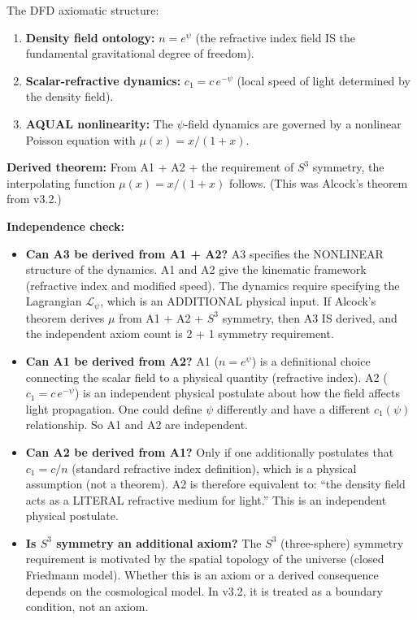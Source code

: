 \documentclass[11pt]{article}
\begin{document}
\begin{tcolorbox}[colback=blue!5!white, colframe=blue!70!black,
  title=\textbf{W4i23 TOP 5 FINDINGS --- PREDICTIONS TEAM}]
\begin{enumerate}
  The DFD axiomatic structure:
  \begin{enumerate}[label=\textbf{A\arabic*.}]
  \item \textbf{Density field ontology:}  $n = e^\psi$ (the refractive
    index field IS the fundamental gravitational degree of freedom).
  \item \textbf{Scalar-refractive dynamics:}  $c_1 = c\,e^{-\psi}$
    (local speed of light determined by the density field).
  \item \textbf{AQUAL nonlinearity:}  The $\psi$-field dynamics are
    governed by a nonlinear Poisson equation with $\mu(x) = x/(1+x)$.
  \end{enumerate}
  \textbf{Derived theorem:}  From A1 + A2 + the requirement of $S^3$
  symmetry, the interpolating function $\mu(x) = x/(1+x)$ follows.
  (This was Alcock's theorem from v3.2.)

  \textbf{Independence check:}

  \begin{itemize}
  \item \textbf{Can A3 be derived from A1 + A2?}  A3 specifies the
    NONLINEAR structure of the dynamics.  A1 and A2 give the kinematic
    framework (refractive index and modified speed).  The dynamics
    require specifying the Lagrangian $\mathcal{L}_\psi$, which is an
    ADDITIONAL physical input.  If Alcock's theorem derives $\mu$
    from A1 + A2 + $S^3$ symmetry, then A3 IS derived, and the
    independent axiom count is 2 + 1 symmetry requirement.

  \item \textbf{Can A1 be derived from A2?}  A1 ($n = e^\psi$) is a
    definitional choice connecting the scalar field to a physical
    quantity (refractive index).  A2 ($c_1 = c\,e^{-\psi}$) is an
    independent physical postulate about how the field affects light
    propagation.  One could define $\psi$ differently and have a
    different $c_1(\psi)$ relationship.  So A1 and A2 are independent.

  \item \textbf{Can A2 be derived from A1?}  Only if one additionally
    postulates that $c_1 = c/n$ (standard refractive index definition),
    which is a physical assumption (not a theorem).  A2 is therefore
    equivalent to: ``the density field acts as a LITERAL refractive
    medium for light.''  This is an independent physical postulate.

  \item \textbf{Is $S^3$ symmetry an additional axiom?}  The $S^3$
    (three-sphere) symmetry requirement is motivated by the spatial
    topology of the universe (closed Friedmann model).  Whether this
    is an axiom or a derived consequence depends on the cosmological
    model.  In v3.2, it is treated as a boundary condition, not an
    axiom.
  \end{itemize}


\end{enumerate}
\end{tcolorbox}
\end{document}
